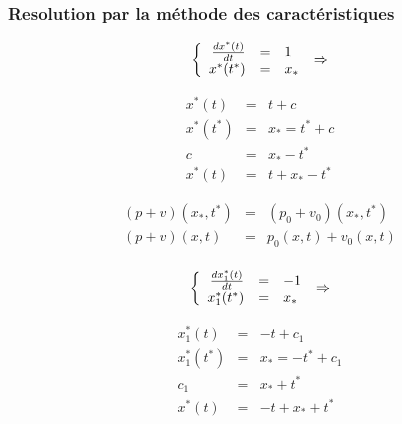 \documentclass[a4paper,11pt]{article}
\begin{document}
\subsubsection*{Resolution par la méthode des caractéristiques}

\begin{equation*}
\left\{
\begin{array}{rcl} 
    \frac{dx^{*}(t)}{dt} &=& 1 \\    
    x^{*}(t^{*}) &=& x_{*}
\end{array}
\right. \\
\Rightarrow
\end{equation*}

\begin{equation*}
\begin{array}{rcl}
x^{*}(t) &=& t +c \\
x^{*}(t^{*}) &=& x_{*} = t^{*}+c \\
c &=& x_{*}-t^{*} \\
x^{*}(t) &=& t + x_{*}-t^{*}
\end{array}
\end{equation*}

\begin{equation*}
\begin{array}{rcl}
    (p+v)(x_{*},t^{*}) &=& (p_{0}+v_{0})(x_{*},t^{*}) \\
    (p+v)(x,t) &=& p_{0}(x,t) + v_{0}(x,t)\\
\end{array}
\end{equation*}



\begin{equation*}
\left\{
\begin{array}{rcl}
    \frac{dx_{1}^{*}(t)}{dt} &=& -1 \\    
    x_{1}^{*}(t^{*}) &=& x_{*}
\end{array}
\right. \\
\Rightarrow
\end{equation*}

\begin{equation*}
\begin{array}{rcl}
    x_{1}^{*}(t) &=& -t +c_{1} \\
    x_{1}^{*}(t^{*}) &=& x_{*} = -t^{*}+c_{1} \\
    c_{1} &=& x_{*} + t^{*} \\
    x^{*}(t) &=& -t + x_{*} + t^{*}
\end{array}
\end{equation*}
\end{document}
